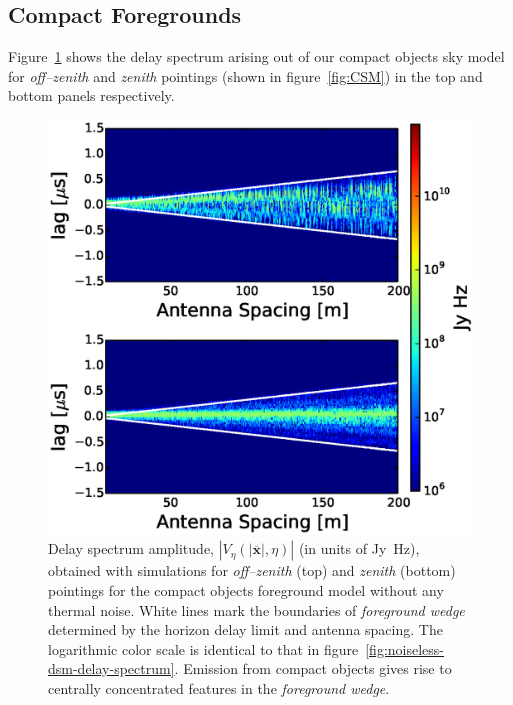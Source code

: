 \documentclass[preprint2,iop,numberedappendix]{emulateapj}
\begin{document}
\subsection{Compact Foregrounds}\label{sec:compact}

Figure~\ref{fig:noiseless-csm-delay-spectrum} shows the delay spectrum arising out of our compact objects sky model for {\it off--zenith} and {\it zenith} pointings (shown in figure~\ref{fig:CSM}) in the top and bottom panels respectively. 

\begin{figure}[htb]
\centering
\includegraphics[width=\linewidth]{figures/v1_0/delta_array_multi_baseline_CLEAN_noiseless_visibilities_0.3m_ground_custom_gaussian_FG_model_csm_all_sky_nside_64_Tsys_90.0K_185.0_MHz_30.7_MHz_bnw2.0.eps}
\caption{Delay spectrum amplitude, $|V_\eta(|\overline{\mathbf{x}}|,\eta)|$ (in units of Jy~Hz), obtained with simulations for {\it off--zenith} (top) and {\it zenith} (bottom) pointings for the compact objects foreground model without any thermal noise. White lines mark the boundaries of {\it foreground wedge} determined by the horizon delay limit and antenna spacing. The logarithmic color scale is identical to that in figure~\ref{fig:noiseless-dsm-delay-spectrum}. Emission from compact objects gives rise to centrally concentrated features in the {\it foreground wedge}.\label{fig:noiseless-csm-delay-spectrum}}
\end{figure}
\end{document}
